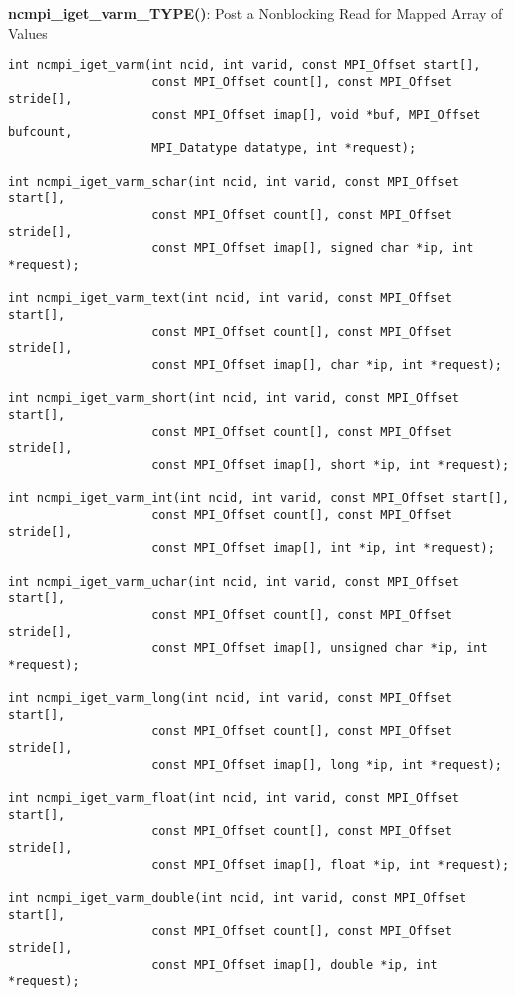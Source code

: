 {\bf ncmpi\_iget\_varm\_TYPE()}: Post a Nonblocking Read for Mapped Array of Values

\begin{verbatim}
int ncmpi_iget_varm(int ncid, int varid, const MPI_Offset start[],
                    const MPI_Offset count[], const MPI_Offset stride[],
                    const MPI_Offset imap[], void *buf, MPI_Offset bufcount,
                    MPI_Datatype datatype, int *request);

int ncmpi_iget_varm_schar(int ncid, int varid, const MPI_Offset start[],
                    const MPI_Offset count[], const MPI_Offset stride[],
                    const MPI_Offset imap[], signed char *ip, int *request);

int ncmpi_iget_varm_text(int ncid, int varid, const MPI_Offset start[],
                    const MPI_Offset count[], const MPI_Offset stride[],
                    const MPI_Offset imap[], char *ip, int *request);

int ncmpi_iget_varm_short(int ncid, int varid, const MPI_Offset start[],
                    const MPI_Offset count[], const MPI_Offset stride[],
                    const MPI_Offset imap[], short *ip, int *request);

int ncmpi_iget_varm_int(int ncid, int varid, const MPI_Offset start[],
                    const MPI_Offset count[], const MPI_Offset stride[],
                    const MPI_Offset imap[], int *ip, int *request);

int ncmpi_iget_varm_uchar(int ncid, int varid, const MPI_Offset start[],
                    const MPI_Offset count[], const MPI_Offset stride[],
                    const MPI_Offset imap[], unsigned char *ip, int *request);

int ncmpi_iget_varm_long(int ncid, int varid, const MPI_Offset start[],
                    const MPI_Offset count[], const MPI_Offset stride[],
                    const MPI_Offset imap[], long *ip, int *request);

int ncmpi_iget_varm_float(int ncid, int varid, const MPI_Offset start[],
                    const MPI_Offset count[], const MPI_Offset stride[],
                    const MPI_Offset imap[], float *ip, int *request);

int ncmpi_iget_varm_double(int ncid, int varid, const MPI_Offset start[],
                    const MPI_Offset count[], const MPI_Offset stride[],
                    const MPI_Offset imap[], double *ip, int *request);
\end{verbatim}
